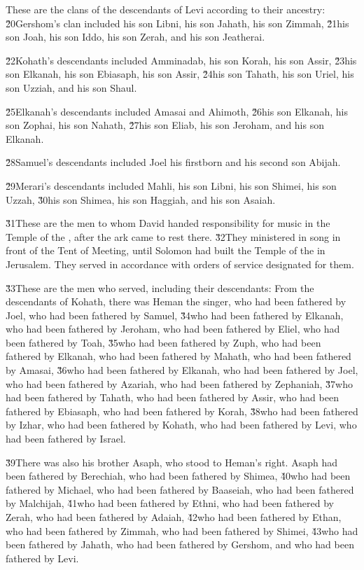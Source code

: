 These are the clans of the descendants of Levi according to their ancestry: \v{20}Gershom's clan included his son Libni, his son Jahath, his son Zimmah, \v{21}his son Joah, his son Iddo, his son Zerah, and his son Jeatherai.

\v{22}Kohath's descendants included Amminadab, his son Korah, his son Assir, \v{23}his son Elkanah, his son Ebiasaph, his son Assir, \v{24}his son Tahath, his son Uriel, his son Uzziah, and his son Shaul.

\v{25}Elkanah's descendants included Amasai and Ahimoth, \v{26}his son Elkanah, his son Zophai, his son Nahath, \v{27}his son Eliab, his son Jeroham, and his son Elkanah.

\v{28}Samuel's descendants included Joel his firstborn and his second son Abijah.

\v{29}Merari's descendants included Mahli, his son Libni, his son Shimei, his son Uzzah, \v{30}his son Shimea, his son Haggiah, and his son Asaiah.

\v{31}These are the men to whom David handed responsibility for music in the Temple of the , after the ark came to rest there. \v{32}They ministered in song in front of the Tent of Meeting, until Solomon had built the Temple of the  in Jerusalem. They served in accordance with orders of service designated for them.

\v{33}These are the men who served, including their descendants: From the descendants of Kohath, there was Heman the singer, who had been fathered by Joel, who had been fathered by Samuel, \v{34}who had been fathered by Elkanah, who had been fathered by Jeroham, who had been fathered by Eliel, who had been fathered by Toah, \v{35}who had been fathered by Zuph, who had been fathered by Elkanah, who had been fathered by Mahath, who had been fathered by Amasai, \v{36}who had been fathered by Elkanah, who had been fathered by Joel, who had been fathered by Azariah, who had been fathered by Zephaniah, \v{37}who had been fathered by Tahath, who had been fathered by Assir, who had been fathered by Ebiasaph, who had been fathered by Korah, \v{38}who had been fathered by Izhar, who had been fathered by Kohath, who had been fathered by Levi, who had been fathered by Israel.

\v{39}There was also his brother Asaph, who stood to Heman's right. Asaph had been fathered by Berechiah, who had been fathered by Shimea, \v{40}who had been fathered by Michael, who had been fathered by Baaseiah, who had been fathered by Malchijah, \v{41}who had been fathered by Ethni, who had been fathered by Zerah, who had been fathered by Adaiah, \v{42}who had been fathered by Ethan, who had been fathered by Zimmah, who had been fathered by Shimei, \v{43}who had been fathered by Jahath, who had been fathered by Gershom, and who had been fathered by Levi.

